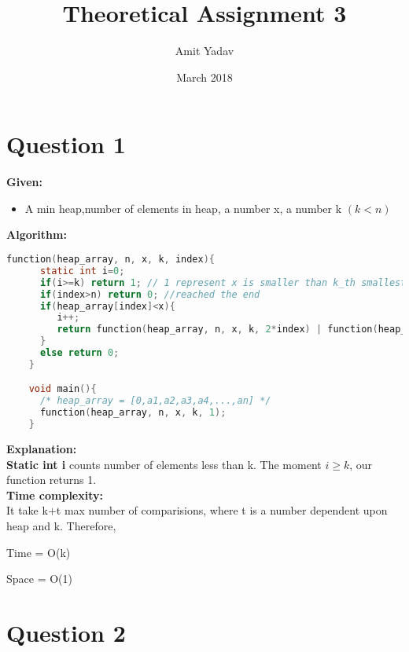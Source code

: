 \documentclass{article}
\title{Theoretical Assignment 3}
\author{Amit Yadav }
\date{March 2018}
\begin{document}
\maketitle

\section*{Question 1}
  \textbf{Given:}
  \begin{itemize}
      \item A min heap,number of elements in heap, a number x, a number k $(k<n)$
  \end{itemize}
  \textbf{Algorithm:}\\
  \begin{lstlisting}[language=C]
    function(heap_array, n, x, k, index){
      static int i=0;
      if(i>=k) return 1; // 1 represent x is smaller than k_th smallest element
      if(index>n) return 0; //reached the end
      if(heap_array[index]<x){
         i++;
         return function(heap_array, n, x, k, 2*index) | function(heap_array, n, x, k, 2*index+1);
      }
      else return 0;
    }

    void main(){
      /* heap_array = [0,a1,a2,a3,a4,...,an] */
      function(heap_array, n, x, k, 1);
    }
  \end{lstlisting}
  \textbf{Explanation:}\\
  \textbf{Static int i} counts number of elements less than k. The moment $i\geq k$, our function returns 1.\\
  \break
  \textbf{Time complexity:}\\
  It take k+t max number of comparisions, where t is a number dependent upon heap and k. Therefore, \\
  \begin{center} Time = O(k) \end{center}
  \begin{center} Space = O(1) \end{center}
  \break

\section*{Question 2}
\end{document}
